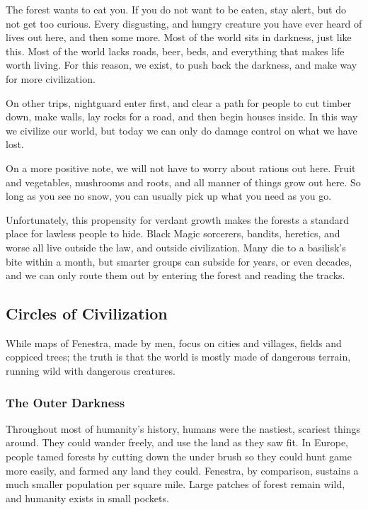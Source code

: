 \begin{multicols}{2}
\begin{exampletext}

	The forest wants to eat you.
	If you do not want to be eaten, stay alert, but do not get too curious.
	Every disgusting, and hungry creature you have ever heard of lives out here, and then some more.
	Most of the world sits in darkness, just like this.
	Most of the world lacks roads, beer, beds, and everything that makes life worth living.
	For this reason, we exist, to push back the darkness, and make way for more civilization.

	On other trips, \gls{nightguard} enter first, and clear a path for people to cut timber down, make walls, lay rocks for a road, and then begin houses inside.
	In this way we civilize our world, but today we can only do damage control on what we have lost.

	On a more positive note, we will not have to worry about rations out here.
	Fruit and vegetables, mushrooms and roots, and all manner of things grow out here.
	So long as you see no snow, you can usually pick up what you need as you go.

	Unfortunately, this propensity for verdant growth makes the forests a standard place for lawless people to hide.
	Black Magic sorcerers, bandits, heretics, and worse all live outside the law, and outside civilization.
	Many die to a basilisk's bite within a month, but smarter groups can subside for years, or even decades, and we can only route them out by entering the forest and reading the tracks.

\end{exampletext}

\subsection{Circles of Civilization}

While maps of Fenestra, made by men, focus on cities and villages, fields and coppiced trees; the truth is that the world is mostly made of dangerous terrain, running wild with dangerous creatures.

\subsubsection{The Outer Darkness}

Throughout most of humanity's history, humans were the nastiest, scariest things around.
They could wander freely, and use the land as they saw fit.
In Europe, people tamed forests by cutting down the under brush so they could hunt game more easily, and farmed any land they could.
Fenestra, by comparison, sustains a much smaller population per square mile.
Large patches of forest remain wild, and humanity exists in small pockets.


\end{multicols}
